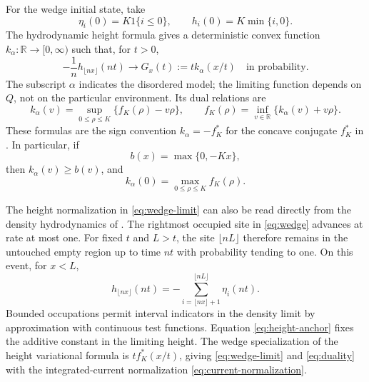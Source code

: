 \documentclass[11pt]{amsart}
\theoremstyle{remark}
\newcommand{\RR}{\mathbb R}
\numberwithin{equation}{section}
\begin{document}
For the wedge initial state, take
\begin{equation}\label{eq:wedge}
 \eta_i(0)=K\mathrm{1}\{i\leq0\},\qquad
 h_i(0)=K\min\{i,0\}.
\end{equation}
The hydrodynamic height formula gives a deterministic convex function
$k_\alpha:\RR\to[0,\infty)$ such that, for $t>0$,
\begin{equation}\label{eq:wedge-limit}
 -\frac1n h_{\lfloor nx\rfloor}(nt)
 \longrightarrow G_x(t):=t k_\alpha(x/t)
 \quad\text{in probability}.
\end{equation}
The subscript $\alpha$ indicates the disordered model; the limiting
function depends on $Q$, not on the particular environment. Its dual
relations are
\begin{equation}\label{eq:duality}
 k_\alpha(v)=\sup_{0\leq\rho\leq K}\{f_K(\rho)-v\rho\},\qquad
 f_K(\rho)=\inf_{v\in\RR}\{k_\alpha(v)+v\rho\}.
\end{equation}
These formulas are the sign convention $k_\alpha=-f_K^*$ for the
concave conjugate $f_K^*$ in \cite[equation (3.2)]{SeppSurvey}.
In particular, if
\begin{equation}\label{eq:boundary}
 b(x)=\max\{0,-Kx\},
\end{equation}
then $k_\alpha(v)\geq b(v)$, and
\begin{equation}\label{eq:central-duality}
 k_\alpha(0)=\max_{0\leq\rho\leq K}f_K(\rho).
\end{equation}

The height normalization in \eqref{eq:wedge-limit} can also be read
directly from the density hydrodynamics of
\cite[Theorem 3]{SeppSurvey}. The rightmost occupied site in
\eqref{eq:wedge} advances at rate at most one. For fixed $t$ and $L>t$,
the site $\lfloor nL\rfloor$ therefore remains in the untouched empty
region up to time $nt$ with probability tending to one. On this event,
for $x<L$,
\begin{equation}\label{eq:height-anchor}
 h_{\lfloor nx\rfloor}(nt)
 =-\sum_{i=\lfloor nx\rfloor+1}^{\lfloor nL\rfloor}\eta_i(nt).
\end{equation}
Bounded occupations permit interval indicators in the density limit by
approximation with continuous test functions. Equation
\eqref{eq:height-anchor} fixes the additive constant in the limiting
height. The wedge specialization of the height variational formula is
$t f_K^*(x/t)$, giving \eqref{eq:wedge-limit} and
\eqref{eq:duality} with the integrated-current normalization
\eqref{eq:current-normalization}.
\end{document}
